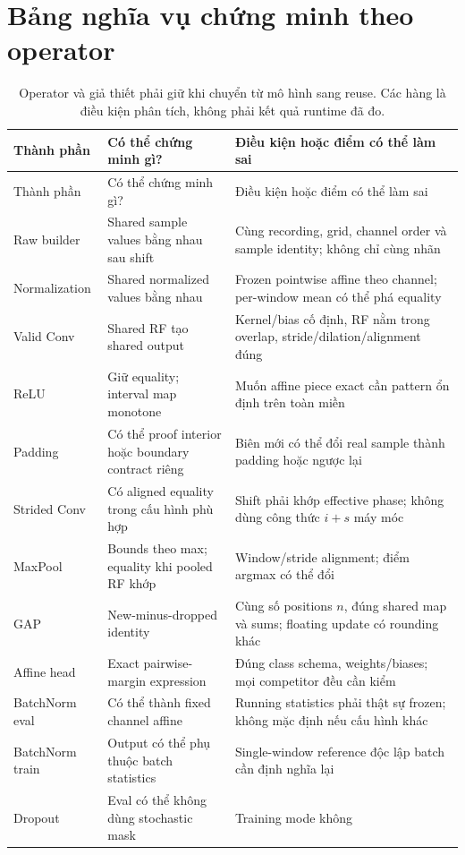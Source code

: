 \documentclass[11pt,a4paper]{article}
\theoremstyle{definition}
\begin{document}
\section{Bảng nghĩa vụ chứng minh theo operator}
\begin{longtable}{@{}P{3cm}P{5.65cm}P{6.15cm}@{}}
\caption{Operator và giả thiết phải giữ khi chuyển từ mô hình sang reuse.
Các hàng là điều kiện phân tích, không phải kết quả runtime đã đo.}
\label{tab:obligations}\\
\toprule Thành phần & Có thể chứng minh gì? & Điều kiện hoặc điểm có thể làm sai\\\midrule
\endfirsthead
\toprule Thành phần & Có thể chứng minh gì? & Điều kiện hoặc điểm có thể làm sai\\\midrule
\endhead
Raw builder & Shared sample values bằng nhau sau shift & Cùng recording,
grid, channel order và sample identity; không chỉ cùng nhãn\\
Normalization & Shared normalized values bằng nhau & Frozen pointwise
affine theo channel; per-window mean có thể phá equality\\
Valid Conv & Shared RF tạo shared output & Kernel/bias cố định, RF nằm
trong overlap, stride/dilation/alignment đúng\\
ReLU & Giữ equality; interval map monotone & Muốn affine piece exact cần
pattern ổn định trên toàn miền\\
Padding & Có thể proof interior hoặc boundary contract riêng & Biên mới
có thể đổi real sample thành padding hoặc ngược lại\\
Strided Conv & Có aligned equality trong cấu hình phù hợp & Shift phải
khớp effective phase; không dùng công thức $i+s$ máy móc\\
MaxPool & Bounds theo max; equality khi pooled RF khớp & Window/stride
alignment; điểm argmax có thể đổi\\
GAP & New-minus-dropped identity & Cùng số positions $n$, đúng shared map
và sums; floating update có rounding khác\\
Affine head & Exact pairwise-margin expression & Đúng class schema,
weights/biases; mọi competitor đều cần kiểm\\
BatchNorm eval & Có thể thành fixed channel affine & Running statistics
phải thật sự frozen; không mặc định nếu cấu hình khác\\
BatchNorm train & Output có thể phụ thuộc batch statistics & Single-window
reference độc lập batch cần định nghĩa lại\\
Dropout & Eval có thể không dùng stochastic mask & Training mode không

\end{longtable}
\end{document}
